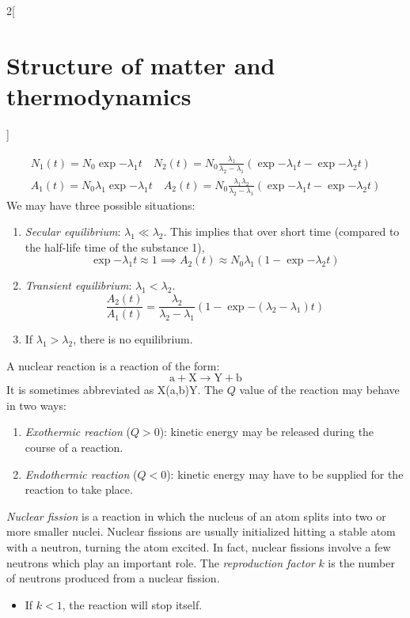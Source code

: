 \documentclass[../../../main_physics.tex]{subfiles}
\begin{document}
\begin{multicols}{2}[\section{Structure of matter and thermodynamics}]
\begin{proposition}
    \begin{gather*}
      N_1(t)=N_0\exp{-\lambda_1t}\quad N_2(t) =N_0\frac{\lambda_1}{\lambda_2-\lambda_1}\left(\exp{-\lambda_1t}-\exp{-\lambda_2t}\right)         \\
      A_1(t)=N_0\lambda_1\exp{-\lambda_1t}\quad A_2(t)=N_0\frac{\lambda_1\lambda_2}{\lambda_2-\lambda_1}\left(\exp{-\lambda_1t}-\exp{-\lambda_2t}\right)
    \end{gather*}
    We may have three possible situations:
    \begin{enumerate}
      \item \emph{Secular equilibrium}: $\lambda_1\ll\lambda_2$. This implies that over short time (compared to the half-life time of the substance 1), $$\exp{-\lambda_1 t}\approx 1\implies A_2(t)\approx N_0\lambda_1(1-\exp{-\lambda_2t})$$
      \item \emph{Transient equilibrium}: $\lambda_1<\lambda_2$.
            $$\frac{A_2(t)}{A_1(t)}=\frac{\lambda_2}{\lambda_2-\lambda_1}\left(1-\exp{-(\lambda_2-\lambda_1)t}\right)$$
      \item If $\lambda_1>\lambda_2$, there is no equilibrium.
    \end{enumerate}
  \end{proposition}
  \begin{definition}
    A nuclear reaction is a reaction of the form:
    $$\text{a}+\text{X}\rightarrow\text{Y}+\text{b}$$
    It is sometimes abbreviated as X(a,b)Y. The $Q$ value of the reaction may behave in two ways:
    \begin{enumerate}
      \item \emph{Exothermic reaction} ($Q>0$): kinetic energy may be released during the course of a reaction.
      \item \emph{Endothermic reaction} ($Q<0$): kinetic energy may have to be supplied for the reaction to take place.
    \end{enumerate}
  \end{definition}
  \begin{definition}
    \emph{Nuclear fission} is a reaction in which the nucleus of an atom splits into two or more smaller nuclei. Nuclear fissions are usually initialized hitting a stable atom with a neutron, turning the atom excited. In fact, nuclear fissions involve a few neutrons which play an important role. The \emph{reproduction factor} $k$ is the number of neutrons produced from a nuclear fission.
    \begin{itemize}
      \item If $k<1$, the reaction will stop itself.

\end{itemize}
\end{definition}
\end{multicols}
\end{document}
